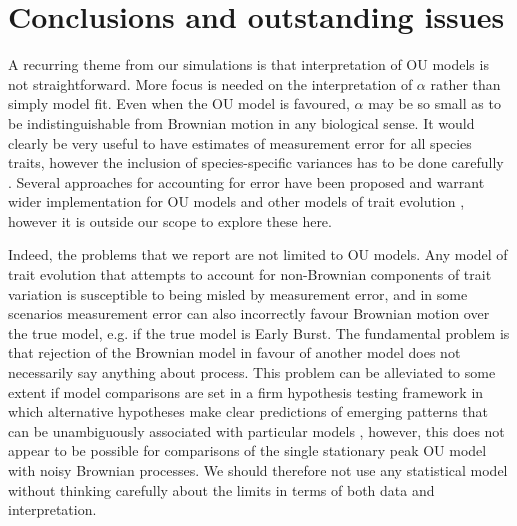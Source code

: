\documentclass[a4paper,12pt]{article}
\begin{document}
\section{Conclusions and outstanding issues}
  A recurring theme from our simulations is that interpretation of OU models is not straightforward. 
  More focus is needed on the interpretation of $\alpha$ rather than simply model fit. 
  Even when the OU model is favoured, $\alpha$ may be so small as to be indistinguishable from Brownian motion in any biological sense. 
  It would clearly be very useful to have estimates of measurement error for all species traits, however the inclusion of species-specific variances has to be done carefully \citep[e.g.,][]{grafen1989phylogenetic}.
  Several approaches for accounting for error have been proposed and warrant wider implementation for OU models and other models of trait evolution \citep[e.g.,][]{lynch1991methods,hansen2012interpreting,martins1997phylogenies,rohlfs2013modeling,ives2007within}, however it is outside our scope to explore these here.

  Indeed, the problems that we report are not limited to OU models. 
  Any model of trait evolution that attempts to account for non-Brownian components of trait variation is susceptible to being misled by measurement error, and in some scenarios measurement error can also incorrectly favour Brownian motion over the true model, e.g. if the true model is Early Burst. 
  The fundamental problem is that rejection of the Brownian model in favour of another model does not necessarily say anything about process. 
  This problem can be alleviated to some extent if model comparisons are set in a firm hypothesis testing framework in which alternative hypotheses make clear predictions of emerging patterns that can be unambiguously associated with particular models \citep[e.g.,][]{Cooper:2011aa}, however, this does not appear to be possible for comparisons of the single stationary peak OU model with noisy Brownian processes. 
  We should therefore not use any statistical model without thinking carefully about the limits in terms of both data and interpretation. 
\end{document}
